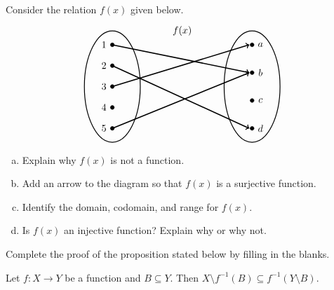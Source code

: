 \documentclass[11pt,letterpaper]{article}
\begin{document}

 Consider the relation $f(x)$ given below. 
	\[
	\begin{tikzpicture}
	\node at (2.5,2) {$f(x)$};
	\draw[line width=0.03cm] (0,0) circle (1 and 2);
	\draw[line width=0.03cm] (5,0) circle (1 and 2);
	
	\draw[fill=black] (0,1.5) circle (0.07);
	\draw[fill=black] (0,0.75) circle (0.07);
	\draw[fill=black] (0,0) circle (0.07);
	\draw[fill=black] (0,-0.75) circle (0.07);
	\draw[fill=black] (0,-1.5) circle (0.07);
	
	\draw[fill=black] (5,1.5) circle (0.07);
	\draw[fill=black] (5,0.50) circle (0.07);
	\draw[fill=black] (5,-0.5) circle (0.07);
	\draw[fill=black] (5,-1.5) circle (0.07);
	
	
	\draw[line width=0.04cm,->] (0,1.5) -- (4.9,0.50);
	\draw[line width=0.04cm,->] (0,0.75) -- (4.9,-1.5);
	\draw[line width=0.04cm,->] (0,0) -- (4.9,1.5);
	\draw[line width=0.04cm,->] (0,-1.5) -- (4.9,0.5);

	
	\node at (-0.3,1.5) {$1$};
	\node at (-0.3,0.75) {$2$};
	\node at (-0.3,0) {$3$};
	\node at (-0.3,-0.75) {$4$};
	\node at (-0.3,-1.5) {$5$};
	
	\node at (5.3,1.5) {$a$};
	\node at (5.3,0.5) {$b$};
	\node at (5.3,-0.5) {$c$};
	\node at (5.3,-1.5) {$d$};
	\end{tikzpicture}
	\]

\begin{enumerate}[(a)]
\item Explain why $f(x)$ is not a function. 
\item Add an arrow to the diagram so that $f(x)$ is a surjective function.
\item Identify the domain, codomain, and range for $f(x)$. 
\item Is $f(x)$ an injective function? Explain why or why not. 
\end{enumerate}



\newpage



 Complete the proof of the proposition stated below by filling in the blanks. \pspace

 Let $f: X \to Y$ be a function and $B \subseteq Y$. Then $X \setminus f^{-1}(B) \subseteq f^{-1}(Y \setminus B)$. \pspace
\end{document}
